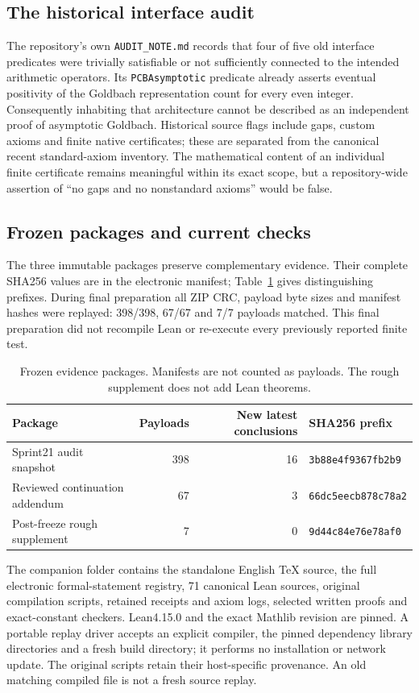\documentclass[11pt,a4paper]{article}
\theoremstyle{definition}
\theoremstyle{remark}
\begin{document}
\subsection{The historical interface audit}\label{sec:historical-audit}
The repository's own \texttt{AUDIT\_NOTE.md} records that four of five old interface predicates were trivially satisfiable or not sufficiently connected to the intended arithmetic operators. Its \texttt{PCBAsymptotic} predicate already asserts eventual positivity of the Goldbach representation count for every even integer. Consequently inhabiting that architecture cannot be described as an independent proof of asymptotic Goldbach. Historical source flags include gaps, custom axioms and finite native certificates; these are separated from the canonical recent standard-axiom inventory. The mathematical content of an individual finite certificate remains meaningful within its exact scope, but a repository-wide assertion of ``no gaps and no nonstandard axioms'' would be false.

\subsection{Frozen packages and current checks}
The three immutable packages preserve complementary evidence. Their complete SHA256 values are in the electronic manifest; Table~\ref{tab:packages} gives distinguishing prefixes. During final preparation all ZIP CRC, payload byte sizes and manifest hashes were replayed: 398/398, 67/67 and 7/7 payloads matched. This final preparation did not recompile Lean or re-execute every previously reported finite test.
\begin{table}[htbp]\centering\small
\begin{tabular}{@{}lrrl@{}}\toprule
Package & Payloads & New latest conclusions & SHA256 prefix\\\midrule
Sprint21 audit snapshot &398&16&\texttt{3b88e4f9367fb2b9}\\
Reviewed continuation addendum &67&3&\texttt{66dc5eecb878c78a2}\\
Post-freeze rough supplement &7&0&\texttt{9d44c84e76e78af0}\\\bottomrule
\end{tabular}
\caption{Frozen evidence packages. Manifests are not counted as payloads. The rough supplement does not add Lean theorems.}\label{tab:packages}
\end{table}

The companion folder contains the standalone English TeX source, the full electronic formal-statement registry, 71 canonical Lean sources, original compilation scripts, retained receipts and axiom logs, selected written proofs and exact-constant checkers. Lean4.15.0 and the exact Mathlib revision are pinned. A portable replay driver accepts an explicit compiler, the pinned dependency library directories and a fresh build directory; it performs no installation or network update. The original scripts retain their host-specific provenance. An old matching compiled file is not a fresh source replay.
\end{document}
